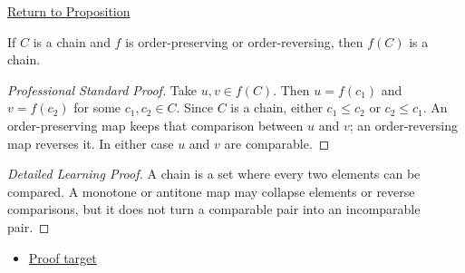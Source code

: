 \newpage
{}
\label{prf:images-chains-monotone}

\begin{remark*}[Return]
\hyperref[prop:images-chains-monotone]{Return to Proposition}
\end{remark*}

\begin{proposition*}
If $C$ is a chain and $f$ is order-preserving or order-reversing, then
$f(C)$ is a chain.
\end{proposition*}

\begin{proof}[Professional Standard Proof]
\LRAProofBodyStart
Take $u,v\in f(C)$. Then $u=f(c_1)$ and $v=f(c_2)$ for some
$c_1,c_2\in C$. Since $C$ is a chain, either $c_1\leq c_2$ or
$c_2\leq c_1$. An order-preserving map keeps that comparison between $u$ and
$v$; an order-reversing map reverses it. In either case $u$ and $v$ are
comparable.
\end{proof}

\begin{proof}[Detailed Learning Proof]
\LRAProofBodyStart
A chain is a set where every two elements can be compared. A monotone or
antitone map may collapse elements or reverse comparisons, but it does not
turn a comparable pair into an incomparable pair.
\end{proof}
\begin{remark*}
\end{remark*}



\begin{dependencies}
\begin{itemize}
  \item \hyperref[prop:images-chains-monotone]{Proof target}
\end{itemize}
\end{dependencies}

\clearpage

